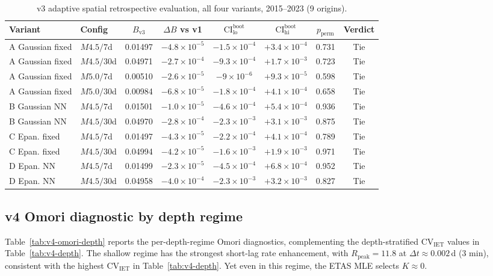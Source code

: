 \documentclass[10pt,a4paper,twocolumn]{article}
\begin{document}
\begin{table}[t]
\centering
\caption{v3 adaptive spatial retrospective evaluation, all four variants, 2015--2023 (9 origins).}\label{tab:v3-all-variants}
\small
\begin{tabular*}{\textwidth}{@{\extracolsep{\fill}}llcccccc}
\toprule
Variant & Config & $B_{\text{v3}}$ & $\Delta B$ vs v1 & $\text{CI}^{\text{boot}}_{\text{lo}}$ & $\text{CI}^{\text{boot}}_{\text{hi}}$ & $p_{\text{perm}}$ & Verdict \\
\midrule
A Gaussian fixed & $M4.5/7$d  & 0.01497 & $-4.8\times10^{-5}$ & $-1.5\times10^{-4}$ & $+3.4\times10^{-4}$ & 0.731 & Tie \\
A Gaussian fixed & $M4.5/30$d & 0.04971 & $-2.7\times10^{-4}$ & $-9.3\times10^{-4}$ & $+1.7\times10^{-3}$ & 0.723 & Tie \\
A Gaussian fixed & $M5.0/7$d  & 0.00510 & $-2.6\times10^{-5}$ & $-9\times10^{-6}$   & $+9.3\times10^{-5}$ & 0.598 & Tie \\
A Gaussian fixed & $M5.0/30$d & 0.00984 & $-6.8\times10^{-5}$ & $-1.8\times10^{-4}$ & $+4.1\times10^{-4}$ & 0.658 & Tie \\
B Gaussian NN    & $M4.5/7$d  & 0.01501 & $-1.0\times10^{-5}$ & $-4.6\times10^{-4}$ & $+5.4\times10^{-4}$ & 0.936 & Tie \\
B Gaussian NN    & $M4.5/30$d & 0.04970 & $-2.8\times10^{-4}$ & $-2.3\times10^{-3}$ & $+3.1\times10^{-3}$ & 0.875 & Tie \\
C Epan. fixed    & $M4.5/7$d  & 0.01497 & $-4.3\times10^{-5}$ & $-2.2\times10^{-4}$ & $+4.1\times10^{-4}$ & 0.789 & Tie \\
C Epan. fixed    & $M4.5/30$d & 0.04994 & $-4.2\times10^{-5}$ & $-1.6\times10^{-3}$ & $+1.9\times10^{-3}$ & 0.971 & Tie \\
D Epan. NN       & $M4.5/7$d  & 0.01499 & $-2.3\times10^{-5}$ & $-4.5\times10^{-4}$ & $+6.8\times10^{-4}$ & 0.952 & Tie \\
D Epan. NN       & $M4.5/30$d & 0.04958 & $-4.0\times10^{-4}$ & $-2.3\times10^{-3}$ & $+3.2\times10^{-3}$ & 0.827 & Tie \\
\bottomrule
\end{tabular*}
\end{table}

\subsection{v4 Omori diagnostic by depth regime}

Table~\ref{tab:v4-omori-depth} reports the per-depth-regime Omori diagnostics, complementing the depth-stratified CV$_{\text{IET}}$ values in Table~\ref{tab:v4-depth}. The shallow regime has the strongest short-lag rate enhancement, with $R_{\text{peak}} = 11.8$ at $\Delta t \approx 0.002$\,d (3 min), consistent with the highest CV$_{\text{IET}}$ in Table~\ref{tab:v4-depth}. Yet even in this regime, the ETAS MLE selects $K\approx0$.
\end{document}
